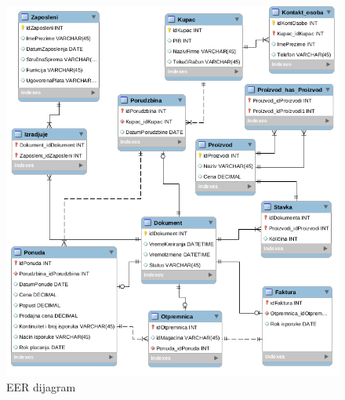 \clearpage

\begin{figure}[ht]
\centering
\includegraphics[width=160mm]{slike/er.png}%
\caption{EER dijagram}
\end{figure}

\clearpage